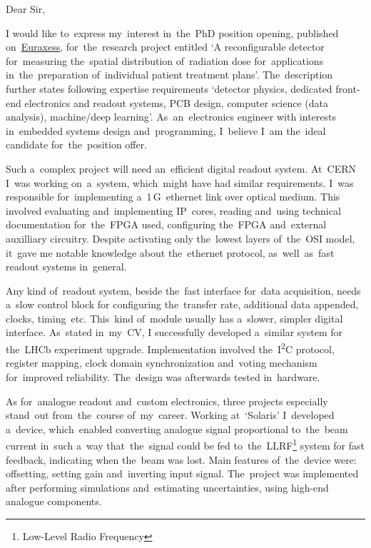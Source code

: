 \documentclass[11pt,a4paper,sans]{article}
\newcommand{\iic}{I\textsuperscript{2}C}
\begin{document}
	\noindent
	Dear Sir,
	\vspace{1\baselineskip}
	
	I would like to~express my~interest in~the~PhD position opening, published 
	on~\href{https://euraxess.ec.europa.eu/jobs/485237}{Euraxess}, for~the~research project
	entitled `A reconfigurable detector for~measuring the~spatial distribution 
	of~radiation dose for~applications in~the~preparation of~individual patient treatment
	plans'. The~description further states following expertise requirements `detector physics,
	dedicated front-end electronics and readout systems, PCB design, computer science (data
	analysis), machine/deep learning'. As~an~electronics engineer with interests in~embedded 
	systems design and~programming, I~believe I~am the~ideal candidate for~the~position offer.
	
	Such a~complex project will need an~efficient digital 
	readout	system. At~CERN I~was working on~a~system, which~might have had similar requirements. 
	I~was responsible 
	for~implementing a~1$\,$G~ethernet link over optical medium. This involved evaluating
	and~implementing IP~cores, reading and~using technical 
	documentation for~the~FPGA used, configuring the~FPGA and~external auxilliary circuitry. 
	Despite activating only the~lowest layers of~the~OSI model, it~gave me 
	notable knowledge about the~ethernet protocol, as~well~as~fast 
	readout systems in~general. 
	
	Any kind of~readout system, beside the~fast interface for~data acquisition, needs a~slow
	control block for configuring the~transfer rate, additional data appended, clocks, timing~etc. 
	This~kind
	of~module usually has a~slower, simpler digital interface. As~stated in~my~CV, I successfully
	developed a~similar system for the~LHCb experiment upgrade. Implementation involved 
	the~\iic\space 
	protocol, register mapping, clock domain synchronization and~voting
	mechanism for~improved reliability. The~design was afterwards tested in~hardware.
	
	As for~analogue readout and~custom electronics, three projects especially stand~out 
	from~the~course of~my~career. Working at~`Solaris' I~developed a~device, which~enabled 
	converting analogue signal proportional to~the~beam current in~such a~way that~the~signal
	could be fed to~the~LLRF\footnote{Low-Level Radio Frequency} system for fast feedback, indicating 
	when the~beam
	was lost. Main features of~the~device were: offsetting, setting gain and~inverting input signal.
	The~project was implemented after performing simulations and~estimating uncertainties, using 
	high-end analogue components.
	
\end{document}
